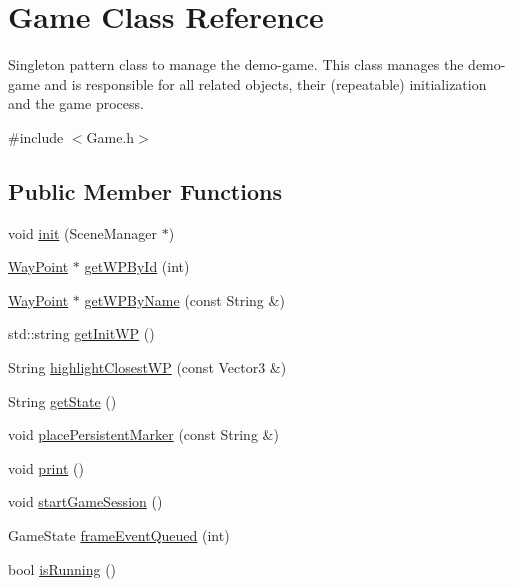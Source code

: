 \hypertarget{classGame}{\section{\-Game \-Class \-Reference}
\label{classGame}
}


\-Singleton pattern class to manage the demo-\/game. \-This class manages the demo-\/game and is responsible for all related objects, their (repeatable) initialization and the game process.  




{\ttfamily \#include $<$\-Game.\-h$>$}

\subsection*{\-Public \-Member \-Functions}
\begin{DoxyCompactItemize}
\item 
void \hyperlink{classGame_a2f27f1c291c93f6d7f92e83d887f829f}{init} (\-Scene\-Manager $\ast$)
\item 
\hyperlink{classWayPoint}{\-Way\-Point} $\ast$ \hyperlink{classGame_a866d4f9558c0db8b9df1a86ae8300858}{get\-W\-P\-By\-Id} (int)
\item 
\hyperlink{classWayPoint}{\-Way\-Point} $\ast$ \hyperlink{classGame_aa364e9488c80216844c77ce81b2495a8}{get\-W\-P\-By\-Name} (const \-String \&)
\item 
std\-::string \hyperlink{classGame_af74c96ac1d39ce6f1ca9874c8cef4444}{get\-Init\-W\-P} ()
\item 
\-String \hyperlink{classGame_a8c026e73dbeeb6972f54c3d21a39b89e}{highlight\-Closest\-W\-P} (const \-Vector3 \&)
\item 
\-String \hyperlink{classGame_a62853a0ff9af086067da2dc102850cbb}{get\-State} ()
\item 
void \hyperlink{classGame_a7c39e1c575ef58a513f32fe1a7f42c52}{place\-Persistent\-Marker} (const \-String \&)
\item 
void \hyperlink{classGame_ae954c7759cc186cdf83bd6cc3cfa8419}{print} ()
\item 
void \hyperlink{classGame_ab136a509fabb87b2a0d1fda33d11a457}{start\-Game\-Session} ()
\item 
\-Game\-State \hyperlink{classGame_ae2e9b7906d1484b598edc707b1bd45dd}{frame\-Event\-Queued} (int)
\item 
bool \hyperlink{classGame_a84a979ffa2ce4f8b0df1951a9ce76ecb}{is\-Running} ()
\end{DoxyCompactItemize}
